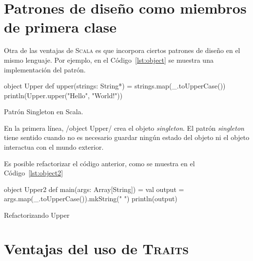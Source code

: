 \section{Patrones de diseño como miembros de primera clase}
\label{sec:patterns}

Otra de las ventajas de \textsc{Scala} es que incorpora ciertos patrones de
diseño en el mismo lenguaje. Por ejemplo, en el Código~\autoref{lst:object} se muestra una
implementación del patrón.

\begin{listing}[H]
  \begin{scalacode}
    object Upper {
      def upper(strings: String*) = strings.map(_.toUpperCase())
    }
    println(Upper.upper("Hello", "World!"))
  \end{scalacode}
  \caption{Patrón Singleton en Scala.}
  \label{lst:object}
\end{listing}

En la primera línea, \scalainline/object Upper/ crea el objeto
\emph{singleton}. El patrón \emph{singleton} tiene sentido cuando no es
necesario guardar ningún estado del objeto ni el objeto interactua con el mundo
exterior.

Es posible refactorizar el código anterior, como se muestra en
el Código~\autoref{lst:object2}

\begin{listing}[H]
  \begin{scalacode}
    object Upper2 {
      def main(args: Array[String]) = {
        val output = args.map(_.toUpperCase()).mkString(" ")
        println(output)
      }
    }
  \end{scalacode}
  \caption{Refactorizando Upper}
  \label{lst:object2}
\end{listing}

\section{Ventajas del uso de \textsc{Traits}}
\label{sec:traitsadvantajes}

